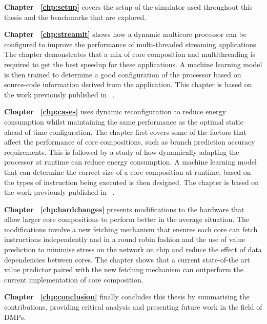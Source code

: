\textbf{Chapter ~\ref{chp:setup}} covers the setup of the simulator used throughout this thesis and the benchmarks that are explored.

\textbf{Chapter ~\ref{chp:streamit}} shows how a dynamic multicore processor can be configured to improve the performance of multi-threaded streaming applications.
The chapter demonstrates that a mix of core composition and multithreading is required to get the best speedup for these applications.
A machine learning model is then trained to determine a good configuration of the processor based on source-code information derived from the application.
This chapter is based on the work previously published in ~\cite{micolet2016dmpstream}.

\textbf{Chapter ~\ref{chp:cases}} uses dynamic reconfiguration to reduce energy consumption whilst maintaining the same performance as the optimal static ahead of time configuration.
The chapter first covers some of the factors that affect the performance of core compositions, such as branch prediction accuracy requirements.
This is followed by a study of how dynamically adapting the processor at runtime can reduce energy consumption.
A machine learning model that can determine the correct size of a core composition at runtime, based on the types of instruction being executed is then designed.
The chapter is based on the work previously published in ~\cite{micolet2017cases}.

\textbf{Chapter ~\ref{chp:hardchanges}} presents modifications to the hardware that allow larger core compositions to perform better in the average situation.
The modifications involve a new fetching mechanism that ensures each core can fetch instructions independently and in a round robin fashion and the use of value prediction to minimise stress on the network on chip and reduce the effect of data dependencies between cores.
The chapter shows that a current state-of-the art value predictor paired with the new fetching mechanism can outperform the current implementation of core composition.

\textbf{Chapter ~\ref{chp:conclusion}} finally concludes this thesis by summarising the contributions, providing critical analysis and presenting future work in the field of DMPs.
